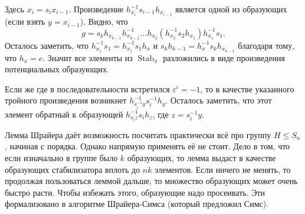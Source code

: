 \documentclass[10pt,a4paper,oneside]{book}
\theoremstyle{definition}
\renewcommand{\leq}{\leqslant}
\newcommand{\Stab}{\operatorname{Stab}}
\def\eps{\varepsilon}
\begin{document}
Здесь $x_i=s_i x_{i-1}$. Произведение $h_{x_i}^{-1}s_{i-1}h_{x_{i-1}}$ является одной из образующих (если взять $y=x_{i-1}$). Видно, что $$g=s_kh_{x_{k-1}}h_{x_{k-1}}^{-1}\dots h_{x_2} (h_{x_2}^{-1}s_2 h_{x_1})h_{x_1}^{-1}s_1.$$
Осталось заметить, что $h_{x_1}^{-1}s_1=h_{x_1}^{-1}s_1h_x$ и $s_k h_{k-1}=h_x^{-1}s_k h_{x_{k-1}}$ благодаря тому, что $h_x=e$. Значит все элементы из $\Stab_x$ разложились в виде произведения потенциальных образующих. 

Если же где в последовательности встретился $\eps^{i}=-1$, то в качестве указанного тройного произведения возникнет $h^{-1}_{s_i^{-1}y} s_i^{-1} h_y$. Осталось заметить, что этот элемент обратный к образующей $h^{-1}_{s_iz}s_i h_z$, где $z=s_i^{-1}y$.

\endproof



Лемма Шрайера даёт возможность посчитать практически всё про группу $H \leq S_n$, начиная с порядка. Однако напрямую применять её не стоит. Дело в том, что если изначально в группе было $k$ образующих, то лемма выдаст в качестве образующих стабилизатора вплоть до $nk$ элементов. Если ничего не менять, то продолжая пользоваться леммой дальше, то множество образующих может очень быстро расти. Чтобы избежать этого, образующие надо просеивать. Эти формализовано в алгоритме Шрайера-Симса (который предложил Симс).












\end{document}
